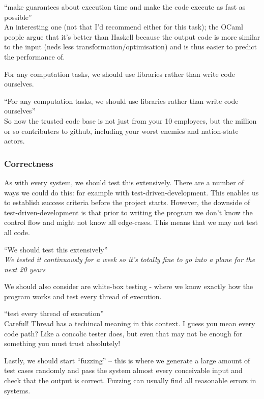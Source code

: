 \documentclass[10pt,\jkfside,a4paper]{article}
\begin{document}
\begin{enumerate}
\begin{enumerate}[label=(\alph*)]
{\color{blue}
``make guarantees about execution time and make the code execute as fast as possible''\\
An interesting one (not that I'd recommend either for this task); the OCaml people argue that it's
better than Haskell because the output code is more similar to the input (neds less transformation/optimisation) and
is thus easier to predict the performance of.
}

For any computation tasks, we should use libraries rather than write code ourselves.

{\color{blue}
``For any computation tasks, we should use libraries rather than write code ourselves''\\
So now the trusted code base is not just from your 10 employees, but the million or so contributers
to github, including your worst enemies and nation-state actors.
}

\subsubsection*{Correctness}

As with every system, we should test this extensively.
There are a number of ways we could do this: for example with test-driven-development.
This enables us to establish success criteria before the project starts.
However, the downside of test-driven-development is that prior to writing the program
we don't know the control flow and might not know all edge-cases.
This means that we may not test all code.

{\color{blue}
``We should test this extensively''\\
\textit{We tested it continuously for a week so it's totally fine to go into a plane for the
next 20 years}
}

We should also consider are white-box testing - where we know exactly how the program
works and test every thread of execution.

{\color{blue}
``test every thread of execution''\\
Careful! Thread has a techincal meaning in this context. I guess you mean every code path? Like a
concolic tester does, but even that may not be enough for something you must trust absolutely!
}

Lastly, we should start ``fuzzing'' -- this is where we generate a large amount of test cases randomly
and pass the system almost every conceivable input and check that the output is correct.
Fuzzing can usually find all reasonable errors in systems.


\end{enumerate}
\end{enumerate}
\end{document}
